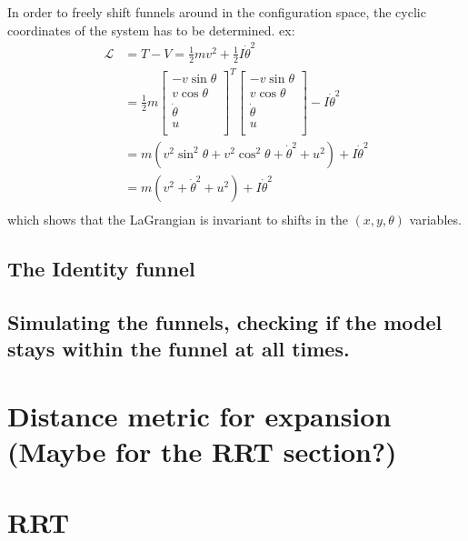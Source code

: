 In order to freely shift funnels around in the configuration space, the cyclic
coordinates of the system has to be determined. ex:
\begin{align}
  \mathcal{L} &= T - V = \frac{1}{2} mv^2 + \frac{1}{2}I\dot{\theta}^2 \\ 
              &= \frac{1}{2} 
                m\begin{bmatrix}
                  -v\sin \theta \\ 
                  v \cos \theta \\
                  \dot{\theta} \\
                  u \\
              \end{bmatrix}^{T} 
  \begin{bmatrix}
                  -v\sin \theta \\ 
                  v \cos \theta \\
                  \dot{\theta} \\
                  u \\
                \end{bmatrix}
  - I\dot{\theta}^2 \\
              &= m \left(
                v^2 \sin^2 \theta + v^2 \cos^2 \theta + {\dot{\theta}}^2 + u^2
                \right)  + I {\dot{\theta}}^2 \\
              &= m(v^2 + {\dot{\theta}}^2 + u^2) + I {\dot{\theta}}^2 \\
\end{align}
which shows that the LaGrangian is invariant to shifts in the \((x,y,\theta)\)
variables. 

\subsection{The Identity funnel}

\subsection{Simulating the funnels, checking if the model stays within the
  funnel at all times.}

\section{Distance metric for expansion (Maybe for the RRT section?)}

\section{RRT}

